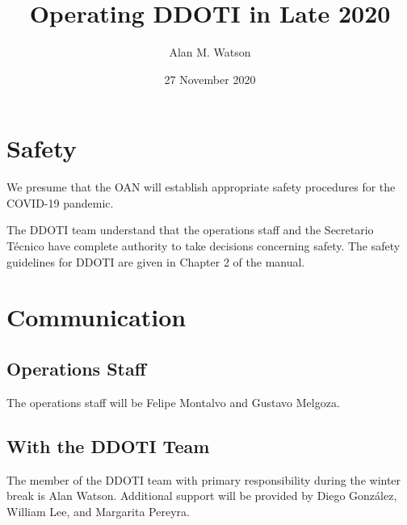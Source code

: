 \documentclass{article}
\title{\bfseries Operating DDOTI in Late 2020}
\author{Alan M. Watson}
\date{27 November 2020}
\begin{document}
\maketitle

\section{Safety}

We presume that the OAN will establish appropriate safety procedures for the COVID-19 pandemic.

The DDOTI team understand that the operations staff and the Secretario Técnico have complete authority to take decisions concerning safety. The safety guidelines for DDOTI are given in Chapter 2 of the manual.

\section{Communication}

\subsection{Operations Staff}

The operations staff will be Felipe Montalvo and Gustavo Melgoza.



\subsection{With the DDOTI Team}

The member of the DDOTI team with primary responsibility during the winter break is Alan Watson. Additional support will be provided by Diego González, William Lee, and Margarita Pereyra.
\end{document}
